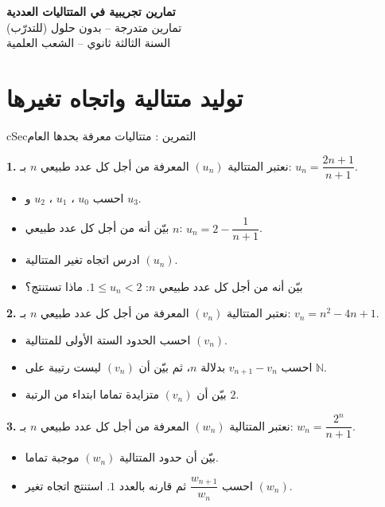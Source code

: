 \documentclass[12pt,a4paper]{article}
\newenvironment{BOX}[2]{\begin{otherlanguage}{english}\begin{arbox}{#1}{#2}}{\end{arbox}\end{otherlanguage}}
\newcounter{exo}
\newenvironment{tamrin}[1]{\stepcounter{exo}\begin{BOX}{cSec}{التمرين \theexo: #1}}{\end{BOX}}
\newenvironment{LTR}{\begin{otherlanguage}{english}}{\end{otherlanguage}}
\newcommand{\N}{\mathbb{N}}
\newenvironment{sq}{\begin{itemize}[leftmargin=2.4em,itemsep=3pt]}{\end{itemize}}
\newcommand{\qa}{\item[(أ)]}\newcommand{\qb}{\item[(ب)]}\newcommand{\qc}{\item[(جـ)]}\newcommand{\qd}{\item[(د)]}\newcommand{\qe}{\item[(هـ)]}
\newcommand{\QQ}[1]{\par\smallskip\textbf{#1.} }
\begin{document}
\begin{LTR}
\begin{tcolorbox}[enhanced,colback=cSec,colframe=cSec,arc=3mm,halign=center,boxrule=0pt,top=12pt,bottom=12pt,before upper={\selectlanguage{arabic}}]
{\color{white}\fontsize{26}{32}\selectfont\bfseries تمارين تجريبية في المتتاليات العددية}\\[8pt]
{\color{white}\large تمارين متدرجة -- بدون حلول (للتدرّب)}\\[5pt]
{\color{white}\large السنة الثالثة ثانوي -- الشعب العلمية}
\end{tcolorbox}
\end{LTR}
\section{توليد متتالية واتجاه تغيرها}

\begin{tamrin}{متتاليات معرفة بحدها العام}
\QQ{1} نعتبر المتتالية $(u_n)$ المعرفة من أجل كل عدد طبيعي $n$ بـ: $u_n=\dfrac{2n+1}{n+1}$.
\begin{sq}
\qa احسب $u_0$ ، $u_1$ ، $u_2$ و $u_3$.
\qb بيّن أنه من أجل كل عدد طبيعي $n$: $u_n=2-\dfrac{1}{n+1}$.
\qc ادرس اتجاه تغير المتتالية $(u_n)$.
\qd بيّن أنه من أجل كل عدد طبيعي $n$: $1\leqslant u_n<2$. ماذا تستنتج؟
\end{sq}
\QQ{2} نعتبر المتتالية $(v_n)$ المعرفة من أجل كل عدد طبيعي $n$ بـ: $v_n=n^{2}-4n+1$.
\begin{sq}
\qa احسب الحدود الستة الأولى للمتتالية $(v_n)$.
\qb احسب $v_{n+1}-v_n$ بدلالة $n$، ثم بيّن أن $(v_n)$ ليست رتيبة على $\N$.
\qc بيّن أن $(v_n)$ متزايدة تماما ابتداء من الرتبة $2$.
\end{sq}
\QQ{3} نعتبر المتتالية $(w_n)$ المعرفة من أجل كل عدد طبيعي $n$ بـ: $w_n=\dfrac{2^{n}}{n+1}$.
\begin{sq}
\qa بيّن أن حدود المتتالية $(w_n)$ موجبة تماما.
\qb احسب $\dfrac{w_{n+1}}{w_n}$ ثم قارنه بالعدد $1$. استنتج اتجاه تغير $(w_n)$.
\end{sq}
\end{tamrin}
\end{document}

